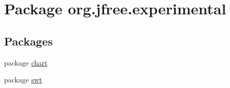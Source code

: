 \hypertarget{namespaceorg_1_1jfree_1_1experimental}{}\section{Package org.\+jfree.\+experimental}
\label{namespaceorg_1_1jfree_1_1experimental}
\subsection*{Packages}
\begin{DoxyCompactItemize}
\item 
package \mbox{\hyperlink{namespaceorg_1_1jfree_1_1experimental_1_1chart}{chart}}
\item 
package \mbox{\hyperlink{namespaceorg_1_1jfree_1_1experimental_1_1swt}{swt}}
\end{DoxyCompactItemize}
